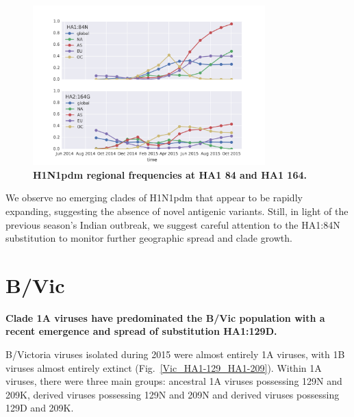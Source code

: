 \documentclass[11pt,oneside,letterpaper]{article}
\begin{document}
\begin{figure}[h!]
	\centering		
	\includegraphics[width=0.8\textwidth]{../figures/sep-2015/H1N1pdm_HA1-84_HA1-164_frequencies.png}
	\caption{\textbf{H1N1pdm regional frequencies at HA1 84 and HA1 164.} 
	}
	\label{H1N1pdm_HA1-84_HA1-164_frequencies}
\end{figure}

We observe no emerging clades of H1N1pdm that appear to be rapidly expanding, suggesting the absence of novel antigenic variants. Still, in light of the previous season's Indian outbreak, we suggest careful attention to the HA1:84N substitution to monitor further geographic spread and clade growth.

\clearpage
\pagebreak

\section*{B/Vic}

\textbf{Clade 1A viruses have predominated the B/Vic population with a recent emergence and spread of substitution HA1:129D.}

B/Victoria viruses isolated during 2015 were almost entirely 1A viruses, with 1B viruses almost entirely extinct (Fig.~\ref{Vic_HA1-129_HA1-209}). Within 1A viruses, there were three main groups: ancestral 1A viruses possessing 129N and 209K, derived viruses possessing 129N and 209N and derived viruses possessing 129D and 209K.
\end{document}
